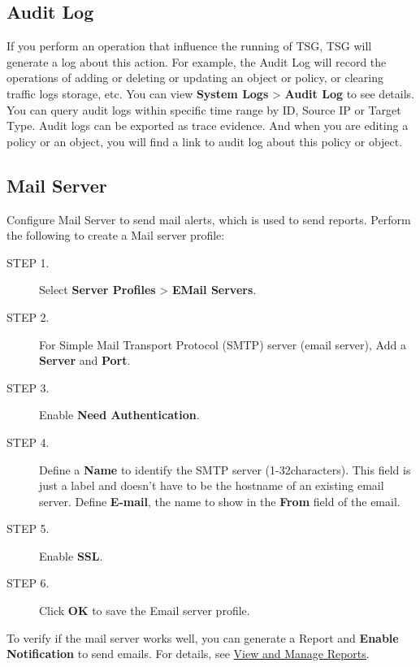 \subsection*{\hypertarget{link:Audit Log}{Audit Log}}
\label{sec:intro:admin:audit}

If you perform an operation that influence the running of TSG, TSG will generate a log about this action. 
For example, the Audit Log will record the operations of adding or deleting or updating an object or policy, or clearing traffic logs storage, etc. 
You can view \textbf{System Logs} > \textbf{Audit Log} to see details. You can query audit logs within specific time range by ID, Source IP or Target Type. 
Audit logs can be exported as trace evidence. And when you are editing a policy or an object, you will find a link to audit log about this policy or object.

\subsection*{\hypertarget{link:Mail Server}{Mail Server}}
\label{sec:intro:admin:mail}

Configure Mail Server to send mail alerts, which is used to send reports. Perform the following to create a Mail server profile:


\begin{description}
    \item[STEP 1.]	Select \textbf{Server Profiles} > \textbf{EMail Servers}.
    \item[STEP 2.]	For Simple Mail Transport Protocol (SMTP) server (email server), Add a \textbf{Server} and \textbf{Port}.    
    \item[STEP 3.]	Enable \textbf{Need Authentication}.
    \item[STEP 4.]	Define a \textbf{Name} to identify the SMTP server (1-32characters). This field is just a label and doesn’t have to be the hostname of an existing email server. 
    Define \textbf{E-mail}, the name to show in the \textbf{From} field of the email.
    \item[STEP 5.]	Enable \textbf{SSL}. 
    \item[STEP 6.]	Click \textbf{OK} to save the Email server profile.
\end{description}


To verify if the mail server works well, you can generate a Report and \textbf{Enable Notification} to send emails. For details, see \hyperlink{link:View and Manage Reports}{\textcolor{linkblue}{View and Manage Reports}}.

